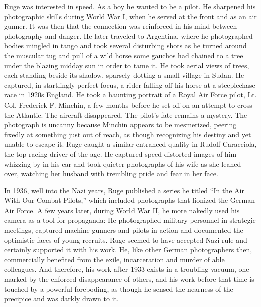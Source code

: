 Ruge was interested in speed. As a boy he wanted to be a pilot. He
sharpened his photographic skills during World War I, when he served at
the front and as an air gunner. It was then that the connection was
reinforced in his mind between photography and danger. He later traveled
to Argentina, where he photographed bodies mingled in tango and took
several disturbing shots as he turned around the muscular tug and pull
of a wild horse some gauchos had chained to a tree under the blazing
midday sun in order to tame it. He took aerial views of trees, each
standing beside its shadow, sparsely dotting a small village in Sudan.
He captured, in startlingly perfect focus, a rider falling off his horse
at a steeplechase race in 1920s England. He took a haunting portrait of
a Royal Air Force pilot, Lt. Col. Frederick F. Minchin, a few months
before he set off on an attempt to cross the Atlantic. The aircraft
disappeared. The pilot's fate remains a mystery. The photograph is
uncanny because Minchin appears to be mesmerized, peering fixedly at
something just out of reach, as though recognizing his destiny and yet
unable to escape it. Ruge caught a similar entranced quality in Rudolf
Caracciola, the top racing driver of the age. He captured
speed-distorted images of him whizzing by in his car and took quieter
photographs of his wife as she leaned over, watching her husband with
trembling pride and fear in her face.

In 1936, well into the Nazi years, Ruge published a series he titled
``In the Air With Our Combat Pilots,'' which included photographs that
lionized the German Air Force. A few years later, during World War II,
he more nakedly used his camera as a tool for propaganda: He
photographed military personnel in strategic meetings, captured machine
gunners and pilots in action and documented the optimistic faces of
young recruits. Ruge seemed to have accepted Nazi rule and certainly
supported it with his work. He, like other German photographers then,
commercially benefited from the exile, incarceration and murder of able
colleagues. And therefore, his work after 1933 exists in a troubling
vacuum, one marked by the enforced disappearance of others, and his work
before that time is touched by a powerful foreboding, as though he
sensed the nearness of the precipice and was darkly drawn to it.

